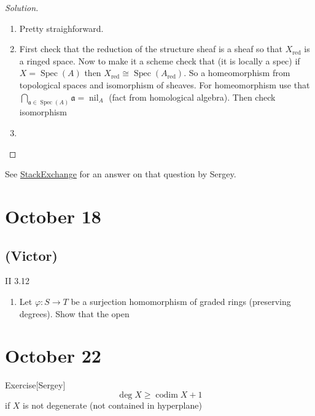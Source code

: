 \begin{proof}[Solution]\leavevmode
	\begin{enumerate}
		\item Pretty straighforward.

		\item First check that the reduction of the structure sheaf is a sheaf  so that $X_{\operatorname{red}}$ is a ringed space. Now to make it a scheme check that (it is locally a spec) if  $X=\operatorname{Spec}(A)$ then $X_{\operatorname{red}}\cong \operatorname{Spec}(A_{\operatorname{red}})$. So a homeomorphism from topological spaces and isomorphism of sheaves. For homeomorphism use that $\bigcap_{\mathfrak{a}\in\operatorname{Spec}(A)} \mathfrak{a}=\operatorname{nil}_A$ (fact from homological algebra). Then check isomorphism
	
		\item 
	\end{enumerate}
\end{proof}

See \href{https://math.stackexchange.com/questions/4158529/computing-the-image-of-a-projective-variety}{StackExchange} for an answer on that question by Sergey.

\section{October 18}

\subsection{(Victor)}

\begin{thing3}{II 3.12}\leavevmode
	\begin{enumerate}[label=\alph*.]
		\item Let $\varphi:S\to T$ be a surjection homomorphism of graded rings (preserving degrees). Show that the open 
	\end{enumerate}
\end{thing3}

\section{October 22}

\begin{thing5}{Exercise}[Sergey]\leavevmode
	\[\operatorname{deg}X\geq \operatorname{codim}X+1\]
	if $X$ is not degenerate (not contained in hyperplane)
\end{thing5}



